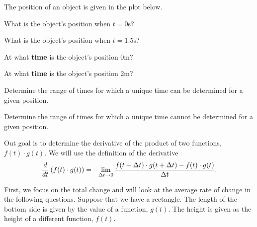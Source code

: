 \begin{problem}

\item The position of an object is given in the plot below.

  \scalebox{0.55}{}

  \begin{subproblem}
    \item What is the object's position when $t=0$s?
      \vfill

    \item What is the object's position when $t=1.5$s?
      \vfill

    \item At what \textbf{time} is the object's position 0m?
      \vfill

    \item At what \textbf{time} is the object's position 2m?
      \vfill

    \item Determine the range of times for which a unique time can be
      determined for a given position.
      \vfill

    \item Determine the range of times for which a unique time cannot be
      determined for a given position.
      \vfill

  \end{subproblem}


\clearpage


\item Out goal is to determine the derivative of the product of two
  functions, $f(t)\cdot g(t)$. We will use the definition of the
  derivative
  \begin{eqnarray*}
    \frac{d}{dt} \left( f(t)\cdot g(t) \right) & = &
          \lim_{\Delta t \rightarrow 0} \frac{f(t+\Delta t)\cdot g(t+\Delta t) - f(t)\cdot g(t)}{\Delta t}.
  \end{eqnarray*}

  First, we focus on the total change and will look at the average
  rate of change in the following questions.  Suppose that we have a
  rectangle. The length of the bottom side is given by the value of a
  function, $g(t)$. The height is given as the height of a different
  function, $f(t)$.


\end{problem}
